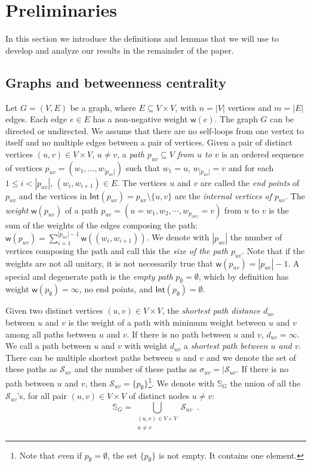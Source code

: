 \section{Preliminaries}\label{sec:prelims}
In this section we introduce the definitions and lemmas that we will use to
develop and analyze our results in the remainder of the paper.

\subsection{Graphs and betweenness centrality}\label{sec:graphprelims}
Let $G=(V,E)$ be a graph, where $E\subseteq V\times V$, with $n=|V|$ vertices
and $m=|E|$ edges. Each edge
$e\in E$ has a non-negative weight $\mathsf{w}(e)$. The graph
$G$ can be directed or undirected. We assume
that there are no self-loops from one vertex to itself and no multiple edges
between a pair of vertices. Given a pair of distinct vertices $(u,v)\in V\times V$,
$u\neq v$, a \emph{path $p_{uv}\subseteq V$ from $u$ to $v$} is an ordered sequence of
vertices $p_{uv}=(w_1,\dotsc,w_{|p_{uv}|})$ such that $w_1=u$, $w_{|p_{uv}|}=v$ and
for each $1\le i < |p_{uv}|$, $(w_i,w_{i+1})\in E$. The vertices $u$ and $v$ are
called the \emph{end points} of $p_{uv}$ and the vertices in
$\mathsf{Int}(p_{uv})=p_{uv}\setminus\{u,v\}$ are the \emph{internal vertices of
$p_{uv}$}. The \emph{weight}
$\mathsf{w}(p_{uv})$ of a path $p_{uv}=(u=w_1,w_2,\cdots,w_{p_{|uv|}}=v)$ from
$u$ to $v$ is the sum of the weights of the edges composing the path:
$\mathsf{w}(p_{uv})=\sum_{i=1}^{|p_{uv}|-1}\mathsf{w}((w_i,w_{i+1}))$. We denote with
$|p_{uv}|$ the number of vertices composing the path and call this the
\emph{size of the path $p_{uv}$}. Note that if the weights are not all unitary,
it is not necessarily true that $\mathsf{w}(p_{uv})=|p_{uv}|-1$. A special and
degenerate path is the \emph{empty path} $p_{\emptyset}=\emptyset$, which by
definition has weight $\mathsf{w}(p_\emptyset)=\infty$, no end points, and
$\mathsf{Int}(p_\emptyset)=\emptyset$.

Given two distinct vertices $(u,v)\in V\times V$, the \emph{shortest path distance}
$d_{uv}$ between $u$ and $v$ is the weight of a path with minimum weight 
between $u$ and $v$ among all paths between $u$ and $v$. If there is no path
between $u$ and $v$, $d_{uv}=\infty$. We call a path between $u$ and $v$ with
weight $d_{uv}$ a \emph{shortest path between $u$ and $v$}. There can be
multiple shortest paths between $u$ and $v$ and we denote the set of these paths
as $\mathcal{S}_{uv}$ and the number of these paths as
$\sigma_{uv}=|\mathcal{S}_{uv}$. If there is no path between $u$ and $v$, then
$\mathcal{S}_{uv}=\{p_\emptyset\}$\footnote{Note that even if
$p_\emptyset=\emptyset$, the set $\{p_\emptyset\}$ is not empty. It contains
one element.}.
We denote with $\mathbb{S}_G$ the union of all the $\mathcal{S}_{uv}$'s, for all
pair $(u,v)\in V\times V$ of distinct nodes $u\neq v$: 
\[ \mathbb{S}_G=\bigcup_{\substack{(u,v)\in V\times V \\ u\neq v}}\mathcal{S}_{uv}\enspace.\]


